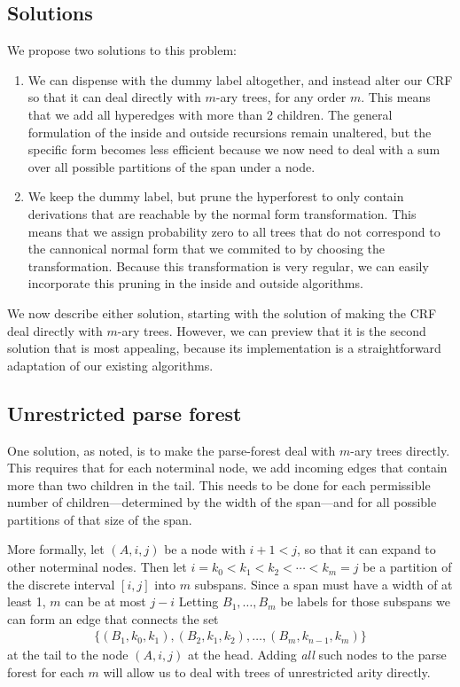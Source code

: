   \subsection{Solutions}
    We propose two solutions to this problem:
    \begin{enumerate}
      \item We can dispense with the dummy label altogether, and instead alter our CRF so that it can deal directly with $m$-ary trees, for any order $m$. This means that we add all hyperedges with more than 2 children. The general formulation of the inside and outside recursions remain unaltered, but the specific form becomes less efficient because we now need to deal with a sum over all possible partitions of the span under a node.
      \item We keep the dummy label, but prune the hyperforest to only contain derivations that are reachable by the normal form transformation. This means that we assign probability zero to all trees that do not correspond to the cannonical normal form that we commited to by choosing the transformation. Because this transformation is very regular, we can easily incorporate this pruning in the inside and outside algorithms.
    \end{enumerate}

    We now describe either solution, starting with the solution of making the CRF deal directly with $m$-ary trees. However, we can preview that it is the second solution that is most appealing, because its implementation is a straightforward adaptation of our existing algorithms.

  \subsection{Unrestricted parse forest}
    One solution, as noted, is to make the parse-forest deal with $m$-ary trees directly. This requires that for each noterminal node, we add incoming edges that contain more than two children in the tail. This needs to be done for each permissible number of children---determined by the width of the span---and for all possible partitions of that size of the span.

    More formally, let $(A,i,j)$ be a node with $i + 1 < j$, so that it can expand to other noterminal nodes. Then let $i = k_0 < k_1 < k_2 < \cdots < k_m = j$ be a partition of the discrete interval $[i, j]$ into $m$ subspans. Since a span must have a width of at least 1, $m$ can be at most $j-i$ Letting $B_1, \dots, B_m$ be labels for those subspans we can form an edge that connects the set
    \begin{align*}
      \Big\{ (B_1, k_0, k_1), (B_2, k_1, k_2), \dots, (B_m, k_{n-1}, k_m) \Big\}
    \end{align*}
    at the tail to the node $(A, i, j)$ at the head. Adding \textit{all} such nodes to the parse forest for each $m$ will allow us to deal with trees of unrestricted arity directly.

